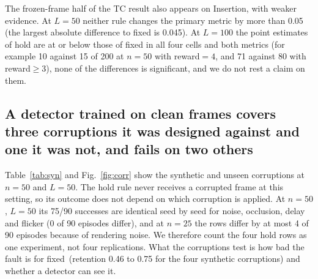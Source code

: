\documentclass[11pt]{article}
\newcommand{\hold}{\textsf{hold}\xspace}
\newcommand{\fixed}{\textsf{fixed}\xspace}
\begin{document}
\begin{table}[t]
\centering\small
\resizebox{\textwidth}{!}{}
\caption{Insertion (200 seeds). Counts are successes; \fixed is the same-loop rerun. Top: reward${=}4$, the primary metric. Bottom: reward${\ge}3$, a post hoc secondary metric. Notation as in Table~\ref{tab:hold}.}
\label{tab:ins}
\end{table}

The frozen-frame half of the TC result also appears on Insertion, with weaker evidence. At $L{=}50$ neither rule changes the primary metric by more than 0.05 (the largest absolute difference to \fixed is 0.045). At $L{=}100$ the point estimates of hold are at or below those of \fixed in all four cells and both metrics (for example 10 against 15 of 200 at $n{=}50$ with reward${=}4$, and 71 against 80 with reward${\ge}3$), none of the differences is significant, and we do not rest a claim on them.

\subsection{A detector trained on clean frames covers three corruptions it was designed against and one it was not, and fails on two others}
\label{sec:res-ood}

Table~\ref{tab:syn} and Fig.~\ref{fig:corr} show the synthetic and unseen corruptions at $n{=}50$ and $L{=}50$. The hold rule never receives a corrupted frame at this setting, so its outcome does not depend on which corruption is applied. At $n{=}50$, $L{=}50$ its 75/90 successes are identical seed by seed for noise, occlusion, delay and flicker (0 of 90 episodes differ), and at $n{=}25$ the rows differ by at most 4 of 90 episodes because of rendering noise. We therefore count the four hold rows as one experiment, not four replications. What the corruptions test is how bad the fault is for \fixed\ (retention 0.46 to 0.75 for the four synthetic corruptions) and whether a detector can see it.

\begin{table}[t]
\centering\small
\resizebox{\textwidth}{!}{}
\caption{Synthetic and unseen corruptions, TC, $n{=}50$, $L{=}50$, 90 seeds. The \hold column repeats one experiment in the first four rows (identical outcomes); blur and dim have their own hold runs, which also give 75/90. ``Flagged'': share of in-window steps flagged by the OOD detector. ``Clean'' for blur and dim is the same-loop clean rate; for the others it is the clean rate of the LeRobot loop. Notation as in Table~\ref{tab:hold}.}
\label{tab:syn}
\end{table}
\end{document}
